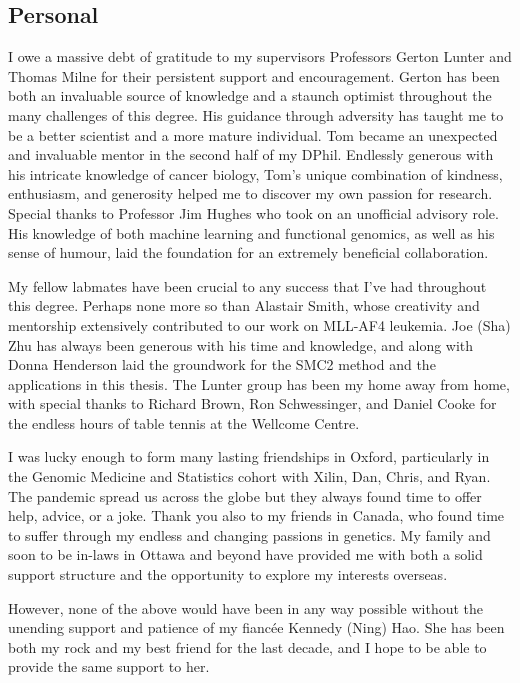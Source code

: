 \subsection*{Personal}

I owe a massive debt of gratitude to my supervisors Professors Gerton Lunter and Thomas Milne for their persistent support and encouragement. Gerton has been both an invaluable source of knowledge and a staunch optimist throughout the many challenges of this degree. His guidance through adversity has taught me to be a better scientist and a more mature individual. Tom became an unexpected and invaluable mentor in the second half of my DPhil. Endlessly generous with his intricate knowledge of cancer biology, Tom's unique combination of kindness, enthusiasm, and generosity helped me to discover my own passion for research. Special thanks to Professor Jim Hughes who took on an unofficial advisory role. His knowledge of both machine learning and functional genomics, as well as his sense of humour, laid the foundation for an extremely beneficial collaboration. 

My fellow labmates have been crucial to any success that I've had throughout this degree. Perhaps none more so than Alastair Smith, whose creativity and mentorship extensively contributed to our work on MLL-AF4 leukemia. Joe (Sha) Zhu has always been generous with his time and knowledge, and along with Donna Henderson laid the groundwork for the SMC2 method and the applications in this thesis. The Lunter group has been my home away from home, with special thanks to Richard Brown, Ron Schwessinger, and Daniel Cooke for the endless hours of table tennis at the Wellcome Centre. 

I was lucky enough to form many lasting friendships in Oxford, particularly in the Genomic Medicine and Statistics cohort with Xilin, Dan, Chris, and Ryan. The pandemic spread us across the globe but they always found time to offer help, advice, or a joke. Thank you also to my friends in Canada, who found time to suffer through my endless and changing passions in genetics. My family and soon to be in-laws in Ottawa and beyond have provided me with both a solid support structure and the opportunity to explore my interests overseas. 

However, none of the above would have been in any way possible without the unending support and patience of my fiancée Kennedy (Ning) Hao. She has been both my rock and my best friend for the last decade, and I hope to be able to provide the same support to her.  


